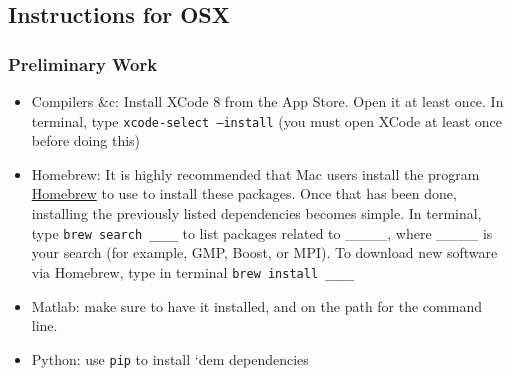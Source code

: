 
\subsection{Instructions for OSX}


\subsubsection{Preliminary Work}
\begin{itemize}
  \item Compilers \&c: Install XCode 8 from the App Store.  Open it at least once.  In terminal, type {\tt xcode-select --install} (you must open XCode at least once before doing this)
   
  \item Homebrew: It is highly recommended that Mac users install the program \href{http://brew.sh}{Homebrew} to use to install these packages. Once that has been done, installing the previously listed dependencies becomes simple. In terminal,  type \texttt{brew search \_\_\_\_} to list packages related to \_\_\_\_, where \_\_\_\_ is your search (for example, GMP, Boost, or MPI). To download new software via Homebrew, type in terminal \texttt{brew install \_\_\_\_} 
   \item Matlab: make sure to have it installed, and on the path for the command line.
   \item Python: use {\tt pip} to install `dem dependencies
\end{itemize}


